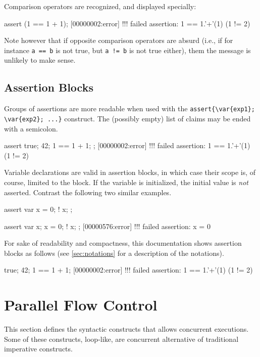 Comparison operators are recognized, and displayed specially:
\begin{urbiscript}
assert (1 == 1 + 1);
[00000002:error] !!! failed assertion: 1 == 1.'+'(1) (1 != 2)
\end{urbiscript}

Note however that if opposite comparison operators are absurd (i.e., if for
instance \lstinline|a == b| is not true, but \lstinline|a != b| is not true
either), them the message is unlikely to make sense.

\subsection{Assertion Blocks}

Groups of assertions are more readable when used with the
\lstinline|assert{\var{exp1}; \var{exp2}; ...}| construct.  The (possibly
empty) list of claims may be ended with a semicolon.

\begin{urbiscript}
assert
{
  true;
  42;
  1 == 1 + 1;
};
[00000002:error] !!! failed assertion: 1 == 1.'+'(1) (1 != 2)
\end{urbiscript}

Variable declarations are valid in assertion blocks, in which case their
scope is, of course, limited to the block.  If the variable is initialized,
the initial value is \emph{not} asserted.  Contrast the following two
similar examples.

\begin{urbiscript}
assert
{
  var x = 0;
  ! x;
};

assert
{
  var x;
  x = 0;
  ! x;
};
[00000576:error] !!! failed assertion: x = 0
\end{urbiscript}

For sake of readability and compactness, this documentation shows assertion
blocks as follows (see \autoref{sec:notations} for a description of the
notations).

\begin{urbiassert}
true;
42;
1 == 1 + 1;
[00000002:error] !!! failed assertion: 1 == 1.'+'(1) (1 != 2)
\end{urbiassert}


\section{Parallel Flow Control}

This section defines the syntactic constructs that allows concurrent
executions.  Some of these constructs, loop-like, are concurrent alternative
of traditional imperative constructs.

